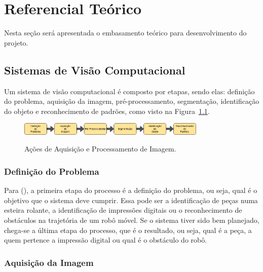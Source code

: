 \chapter{Referencial Teórico}
\label{chap:refteorico}

Nesta seção será apresentada o embasamento teórico para desenvolvimento do projeto.

\section{Sistemas de Visão Computacional}
\label{sec:sistemasVisaoArtificial}

Um sistema de visão computacional é composto por etapas, sendo elas: definição do problema, aquisição da imagem, pré-processamento, segmentação, identificação do objeto e reconhecimento de padrões, como visto na Figura~\ref{fig:acoesProcImagem}.

\begin{figure}[!hbtp]
  \centering
   \caption{Ações de Aquisição e Processamento de Imagem.}
    \includegraphics[width = 0.8\textwidth]{Caps/Figs/ref-teorico/acoes-procImagem.jpg}
   \label{fig:acoesProcImagem}
\end{figure}

\subsection{Definição do Problema}
\label{subsec:defProblema}

Para \citeauthor{rogeralex1999} (\citeyear{rogeralex1999}), a primeira etapa do processo é a definição do problema, ou seja, qual é o objetivo que o sistema deve cumprir. Essa pode ser a identificação de peças numa esteira rolante, a identificação de impressões digitais ou o reconhecimento de obstáculos na trajetória de um robô móvel. Se o sistema tiver sido bem planejado, chega-se a última etapa do processo, que é o resultado, ou seja, qual é a peça, a quem pertence a impressão digital ou qual é o obstáculo do robô.

\subsection{Aquisição da Imagem}
\label{subsec:aquisImagem}

